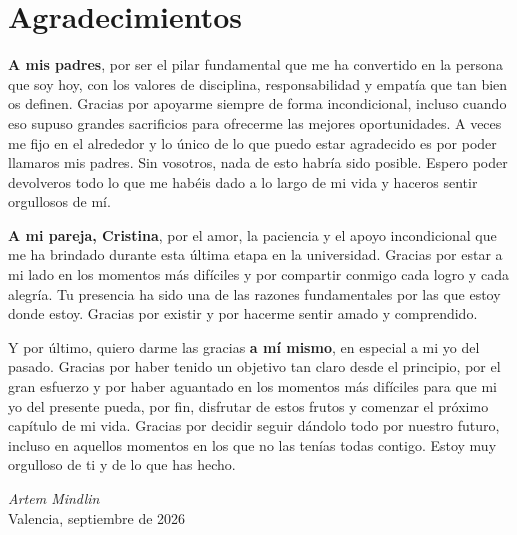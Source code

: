 \chapter*{Agradecimientos}

\vspace{0.5cm}

\textbf{A mis padres}, por ser el pilar fundamental que me ha convertido en la persona que soy hoy, con los valores de disciplina, responsabilidad y empatía que tan bien os definen. Gracias por apoyarme siempre de forma incondicional, incluso cuando eso supuso grandes sacrificios para ofrecerme las mejores oportunidades. A veces me fijo en el alrededor y lo único de lo que puedo estar agradecido es por poder llamaros mis padres. Sin vosotros, nada de esto habría sido posible. Espero poder devolveros todo lo que me habéis dado a lo largo de mi vida y haceros sentir orgullosos de mí.

\vspace{0.4cm}

\textbf{A mi pareja, Cristina}, por el amor, la paciencia y el apoyo incondicional que me ha brindado durante esta última etapa en la universidad. Gracias por estar a mi lado en los momentos más difíciles y por compartir conmigo cada logro y cada alegría. Tu presencia ha sido una de las razones fundamentales por las que estoy donde estoy. Gracias por existir y por hacerme sentir amado y comprendido.

\vspace{0.4cm}

Y por último, quiero darme las gracias \textbf{a mí mismo}, en especial a mi yo del pasado. Gracias por haber tenido un objetivo tan claro desde el principio, por el gran esfuerzo y por haber aguantado en los momentos más difíciles para que mi yo del presente pueda, por fin, disfrutar de estos frutos y comenzar el próximo capítulo de mi vida. Gracias por decidir seguir dándolo todo por nuestro futuro, incluso en aquellos momentos en los que no las tenías todas contigo. Estoy muy orgulloso de ti y de lo que has hecho.

\vspace{2cm}
\begin{flushright}
\textit{Artem Mindlin}\\[0.2cm]
Valencia, septiembre de 2026
\end{flushright}
